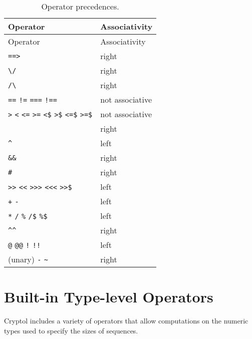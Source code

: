 \begin{longtable}[]{@{}ll@{}}
\caption{Operator precedences.}\tabularnewline
\toprule
Operator & Associativity \\
\midrule
\endfirsthead
\toprule
Operator & Associativity \\
\midrule
\endhead
\texttt{==\textgreater{}} & right \\
\texttt{\textbackslash{}/} & right \\
\texttt{/\textbackslash{}} & right \\
\texttt{==} \texttt{!=} \texttt{===} \texttt{!==} & not associative \\
\texttt{\textgreater{}} \texttt{\textless{}} \texttt{\textless{}=}
\texttt{\textgreater{}=} \texttt{\textless{}\$}
\texttt{\textgreater{}\$} \texttt{\textless{}=\$}
\texttt{\textgreater{}=\$} & not associative \\
\texttt{\textbar{}\textbar{}} & right \\
\texttt{\^{}} & left \\
\texttt{\&\&} & right \\
\texttt{\#} & right \\
\texttt{\textgreater{}\textgreater{}} \texttt{\textless{}\textless{}}
\texttt{\textgreater{}\textgreater{}\textgreater{}}
\texttt{\textless{}\textless{}\textless{}}
\texttt{\textgreater{}\textgreater{}\$} & left \\
\texttt{+} \texttt{-} & left \\
\texttt{*} \texttt{/} \texttt{\%} \texttt{/\$} \texttt{\%\$} & left \\
\texttt{\^{}\^{}} & right \\
\texttt{@} \texttt{@@} \texttt{!} \texttt{!!} & left \\
(unary) \texttt{-} \texttt{\textasciitilde{}} & right \\
\bottomrule
\end{longtable}

\hypertarget{built-in-type-level-operators}{%
\section{Built-in Type-level
Operators}\label{built-in-type-level-operators}}

Cryptol includes a variety of operators that allow computations on the
numeric types used to specify the sizes of sequences.

